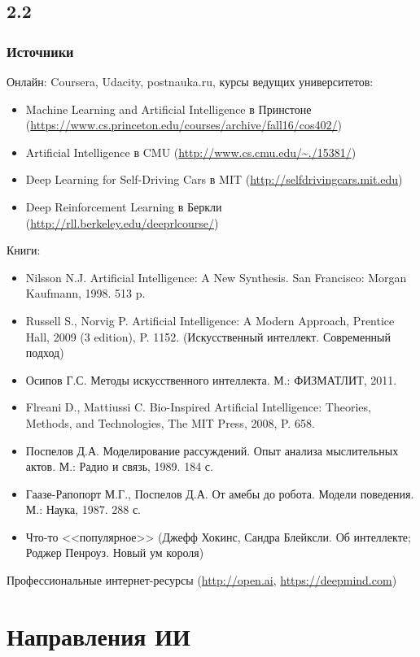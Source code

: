 \documentclass[default]{beamer}
\begin{document}
	\subsection{2.2}
	\begin{frame}
		\frametitle{Источники}
		\scriptsize
		Онлайн: Coursera, Udacity, postnauka.ru, курсы ведущих университетов:
				\begin{itemize}
					\item Machine Learning and Artificial Intelligence в Принстоне (\url{https://www.cs.princeton.edu/courses/archive/fall16/cos402/})
					\item Artificial Intelligence в CMU (\url{http://www.cs.cmu.edu/~./15381/})
					\item Deep Learning for Self-Driving Cars в MIT (\url{http://selfdrivingcars.mit.edu})
					\item Deep Reinforcement Learning в Беркли (\url{http://rll.berkeley.edu/deeprlcourse/})
				\end{itemize}
		Книги:
			\begin{itemize}
				\item  Nilsson N.J. Artificial Intelligence: A New Synthesis. San Francisco: Morgan Kaufmann, 1998. 513 p.
				\item Russell S., Norvig P. Artificial Intelligence: A Modern Approach, Prentice Hall, 2009 (3 edition), P. 1152. (Искусственный интеллект. Современный подход)
				\item Осипов Г.С. Методы искусственного интеллекта. М.: ФИЗМАТЛИТ, 2011.
				\item Flreani D., Mattiussi C. Bio-Inspired Artificial Intelligence: Theories, Methods, and Technologies, The MIT Press, 2008, P. 658.
				\item Поспелов Д.А. Моделирование рассуждений. Опыт анализа мыслительных актов. М.: Радио и связь, 1989. 184 с.
				\item Гаазе-Рапопорт М.Г., Поспелов Д.А. От амебы до робота. Модели поведения. М.: Наука, 1987. 288 с.
				\item Что-то <<популярное>> (Джефф Хокинс, Сандра Блейксли. Об интеллекте; Роджер Пенроуз. Новый ум короля)
			\end{itemize}
	   Профессиональные интернет-ресурсы (\url{http://open.ai}, \url{https://deepmind.com})
	\end{frame}


	\section{Направления ИИ}
\end{document}
